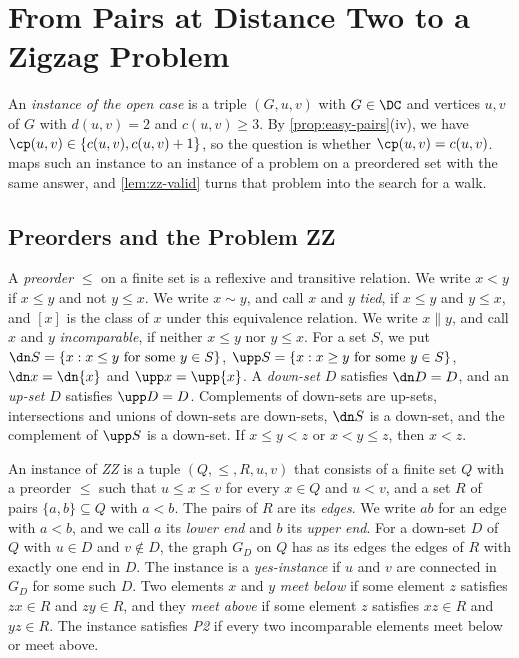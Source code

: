 \section{From Pairs at Distance Two to a Zigzag Problem}
\label{sec:zz-zigzag}

An \emph{instance of the open case} is a triple $(G, u, v)$ with $G \in \DC$ and vertices $u, v$ of $G$ with $d(u, v) = 2$ and $c(u, v) \geq 3$.
By \cref{prop:easy-pairs}(iv), we have $\cp(u, v) \in \{c(u, v), c(u, v) + 1\}$, so the question is whether $\cp(u, v) = c(u, v)$.
 maps such an instance to an instance of a problem on a preordered set with the same answer, and \cref{lem:zz-valid} turns that problem into the search for a walk.

\subsection{Preorders and the Problem ZZ}
\label{sec:zz-preorders}

\begin{definition}[Preorders]
\label{def:zz-preorder}
A \emph{preorder} $\leq$ on a finite set is a reflexive and transitive relation.
We write $x < y$ if $x \leq y$ and not $y \leq x$.
We write $x \sim y$, and call $x$ and $y$ \emph{tied}, if $x \leq y$ and $y \leq x$, and $[x]$ is the class of $x$ under this equivalence relation.
We write $x \parallel y$, and call $x$ and $y$ \emph{incomparable}, if neither $x \leq y$ nor $y \leq x$.
For a set $S$, we put $\dn S = \{x : x \leq y \text{ for some } y \in S\}$, $\upp S = \{x : x \geq y \text{ for some } y \in S\}$, $\dn x = \dn \{x\}$ and $\upp x = \upp \{x\}$.
A \emph{down-set} $D$ satisfies $\dn D = D$, and an \emph{up-set} $D$ satisfies $\upp D = D$.
Complements of down-sets are up-sets, intersections and unions of down-sets are down-sets, $\dn S$ is a down-set, and the complement of $\upp S$ is a down-set.
If $x \leq y < z$ or $x < y \leq z$, then $x < z$.
\end{definition}

\begin{definition}[ZZ and P2]
\label{def:zz-zz}
An instance of \emph{ZZ} is a tuple $(Q, \leq, R, u, v)$ that consists of a finite set $Q$ with a preorder $\leq$ such that $u \leq x \leq v$ for every $x \in Q$ and $u < v$, and a set $R$ of pairs $\{a, b\} \subseteq Q$ with $a < b$.
The pairs of $R$ are its \emph{edges}.
We write $ab$ for an edge with $a < b$, and we call $a$ its \emph{lower end} and $b$ its \emph{upper end}.
For a down-set $D$ of $Q$ with $u \in D$ and $v \notin D$, the graph $G_D$ on $Q$ has as its edges the edges of $R$ with exactly one end in $D$.
The instance is a \emph{yes-instance} if $u$ and $v$ are connected in $G_D$ for some such $D$.
Two elements $x$ and $y$ \emph{meet below} if some element $z$ satisfies $zx \in R$ and $zy \in R$, and they \emph{meet above} if some element $z$ satisfies $xz \in R$ and $yz \in R$.
The instance satisfies \emph{P2} if every two incomparable elements meet below or meet above.
\end{definition}

